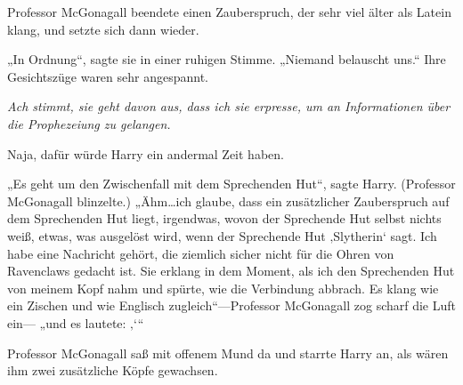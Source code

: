 Professor McGonagall beendete einen Zauberspruch, der sehr viel älter als Latein klang, und setzte sich dann wieder.

„In Ordnung“, sagte sie in einer ruhigen Stimme. „Niemand belauscht uns.“ Ihre Gesichtszüge waren sehr angespannt.

\emph{Ach stimmt, sie geht davon aus, dass ich sie erpresse, um an Informationen über die Prophezeiung zu gelangen.}

Naja, dafür würde Harry ein andermal Zeit haben.

„Es geht um den Zwischenfall mit dem Sprechenden Hut“, sagte Harry. (Professor McGonagall blinzelte.) „Ähm…ich glaube, dass ein zusätzlicher Zauberspruch auf dem Sprechenden Hut liegt, irgendwas, wovon der Sprechende Hut selbst nichts weiß, etwas, was ausgelöst wird, wenn der Sprechende Hut ‚Slytherin‘ sagt. Ich habe eine Nachricht gehört, die ziemlich sicher nicht für die Ohren von Ravenclaws gedacht ist. Sie erklang in dem Moment, als ich den Sprechenden Hut von meinem Kopf nahm und spürte, wie die Verbindung abbrach. Es klang wie ein Zischen und wie Englisch zugleich“—Professor McGonagall zog scharf die Luft ein— „und es lautete: ‚‘“

Professor McGonagall saß mit offenem Mund da und starrte Harry an, als wären ihm zwei zusätzliche Köpfe gewachsen.

